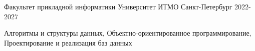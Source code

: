 

\begin{cventries}

  \cventry
    {Факультет прикладной информатики} %
    {Университет ИТМО} %
    {Санкт-Петербург} %
    {2022-2027} %
    {
      \begin{cvitems} %
        \item {Алгоритмы и структуры данных, Объектно-ориентированное программирование, Проектирование и реализация баз данных }
      \end{cvitems}
    }

\end{cventries}
